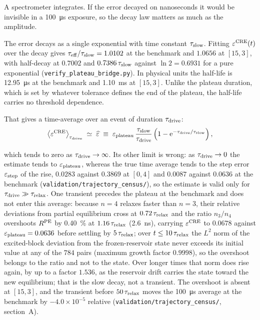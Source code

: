 A spectrometer integrates. If the error decayed on nanoseconds it would be
invisible in a \SI{100}{\micro\second} exposure, so the decay law matters as
much as the amplitude.

The error decays as a single exponential with time constant $\tau_{\mathrm{slow}}$. Fitting
$\varepsilon^{\mathrm{CRE}}(t)$ over the decay gives $\tau_{\mathrm{eff}}/\tau_{\mathrm{slow}} = 1.0102$ at the
benchmark and $1.0656$ at $[15,3]$, with half-decay at $0.7002$ and
$0.7386\,\tau_{\mathrm{slow}}$ against $\ln 2 = 0.6931$ for a pure exponential
(\texttt{verify\_plateau\_bridge.py}). In physical units the half-life is
\SI{12.95}{\micro\second} at the benchmark and \SI{1.10}{\milli\second} at
$[15,3]$. Unlike the plateau duration, which is set by whatever tolerance
defines the end of the plateau, the half-life carries no threshold dependence.

That gives a time-average over an event of duration $\tau_{\mathrm{drive}}$:
\begin{equation}
  \big\langle\varepsilon^{\mathrm{CRE}}\big\rangle_{\tau_{\mathrm{drive}}}
  \;\simeq\; \widehat{\varepsilon} \;\equiv\; \varepsilon_{\mathrm{plateau}}\,\frac{\tau_{\mathrm{slow}}}{\tau_{\mathrm{drive}}}
          \left(1 - \mathrm{e}^{-\tau_{\mathrm{drive}}/\tau_{\mathrm{slow}}}\right) ,
  \label{eq:elm_bound}
\end{equation}

\noindent which tends to zero as $\tau_{\mathrm{drive}}\to\infty$. Its other limit is
wrong: as $\tau_{\mathrm{drive}}\to0$ the estimate tends to $\varepsilon_{\mathrm{plateau}}$, whereas the true
time average tends to the step error $\varepsilon_{\mathrm{step}}$ of the rise, $0.0283$ against
$0.3869$ at $[0,4]$ and $0.0087$ against $0.0636$ at the benchmark
(\texttt{validation/trajectory\_census/}), so the estimate is valid only for
$\tau_{\mathrm{drive}}\gg\tau_{\mathrm{relax}}$. One transient precedes the plateau
at the benchmark and does not enter this average: because $n=4$ relaxes faster
than $n=3$, their relative deviations from partial equilibrium cross at
$0.72\,\tau_{\mathrm{relax}}$ and the ratio $n_3/n_4$ overshoots $R^{\mathrm{PE}}$ by
\SI{0.40}{\percent} at $1.16\,\tau_{\mathrm{relax}}$ (\SI{2.6}{\nano\second}), carrying
$\varepsilon^{\mathrm{CRE}}$ to $0.0678$ against $\varepsilon_{\mathrm{plateau}} = 0.0636$ before settling by
$5\,\tau_{\mathrm{relax}}$; over $t\le10\,\tau_{\mathrm{relax}}$ the $L^{2}$ norm of the excited-block
deviation from the frozen-reservoir state never exceeds its initial value at
any of the $784$ pairs (maximum growth factor $0.9998$), so the overshoot
belongs to the ratio and not to the state. Over longer times that norm does
rise again, by up to a factor $1.536$, as the reservoir drift carries the
state toward the new equilibrium; that is the slow decay, not a transient.
The overshoot is absent at $[15,3]$, and the transient before $50\,\tau_{\mathrm{relax}}$
moves the \SI{100}{\micro\second} average at the benchmark by
$-4.0\times10^{-5}$ relative (\texttt{validation/trajectory\_census/},
section~A).

